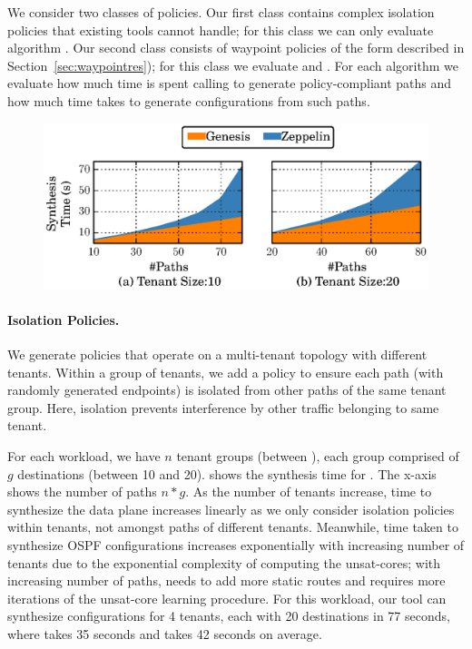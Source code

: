 We consider two classes of policies.
Our first class contains complex isolation policies that 
existing tools cannot handle; for this class we can only evaluate algorithm .
Our second class consists of
 waypoint policies of the form described in Section~\ref{sec:waypointres});
for this class we evaluate  and .
For each algorithm  we evaluate how much time is spent
calling \genesis to generate policy-compliant paths
and how much time \name takes to generate configurations from such paths.




\begin{figure}
	\includegraphics[width=0.58\columnwidth]{figures/ospfisolation.eps}
	\vspace{-8pt}
\end{figure}
\paragraph{Isolation Policies.}
We generate policies that operate 
on a multi-tenant topology with 
 different tenants.
Within a  group of tenants, we add a policy to ensure
each path  (with randomly generated endpoints)
is isolated from other paths of the same tenant group.
Here, isolation  prevents interference by other traffic belonging to
same tenant.  
 
For each 
workload, we have $n$ tenant groups (between ), 
each group comprised of $g$ destinations (between 10 and 20). 
shows the synthesis time 
for .
The x-axis shows the number of  paths $n * g$. 
 As the number of tenants increase, time to 
synthesize the data plane increases linearly as we only 
consider isolation policies within tenants, not amongst paths 
of different tenants. Meanwhile, time taken to synthesize 
OSPF configurations increases exponentially with increasing 
number of tenants due to the exponential complexity of computing 
the unsat-cores; with increasing number of 
paths,  needs to add more static routes  and requires more iterations of the unsat-core learning
procedure. 
For this workload, our tool can
synthesize configurations for 4 tenants, each with
20 destinations in 77 seconds, where \genesis takes 35 seconds and
\name takes 42 seconds on average. 

